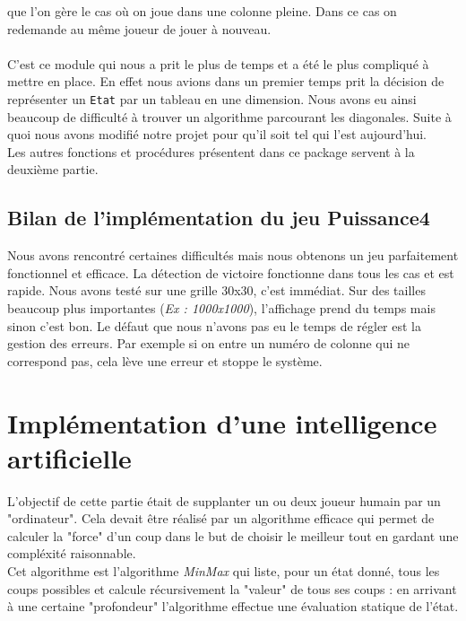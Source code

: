 \documentclass[a4paper,11pt]{article}
\begin{document}
que l'on gère le cas où on joue dans une colonne pleine. Dans ce cas on
redemande au même joueur de jouer à nouveau.\\
\\
C'est ce module qui nous a prit le plus de temps et a été le plus compliqué
à mettre en place. En effet nous avions dans un premier temps prit la décision
de représenter un {\tt Etat} par un tableau en une dimension. Nous avons eu
ainsi beaucoup de difficulté à trouver un algorithme parcourant les diagonales.
Suite à quoi nous avons modifié notre projet pour qu'il soit tel qui l'est
aujourd'hui. \\
Les autres fonctions et procédures présentent dans ce package servent à la
deuxième partie. \\

\subsection{Bilan de l'implémentation du jeu Puissance4}

Nous avons rencontré certaines difficultés mais nous obtenons un jeu parfaitement
fonctionnel et efficace. La détection de victoire fonctionne dans tous les cas et
est rapide. Nous avons testé sur une grille 30x30, c'est immédiat. Sur des tailles
beaucoup plus importantes ({\it Ex : 1000x1000}), l'affichage prend du temps mais
sinon c'est bon. Le défaut que nous n'avons pas eu le temps de régler est la
gestion des erreurs. Par exemple si on entre un numéro de colonne qui ne correspond
pas, cela lève une erreur et stoppe le système.


\section{Implémentation d'une intelligence artificielle}

L'objectif de cette partie était de supplanter un ou deux joueur humain par un
"ordinateur". Cela devait être réalisé par un algorithme efficace qui permet de
calculer la "force" d'un coup dans le but de choisir le meilleur tout en gardant
une compléxité raisonnable.\\
Cet algorithme est l'algorithme {\it MinMax} qui liste, pour un état donné, tous
les coups possibles et calcule récursivement la "valeur" de tous ses coups : en
arrivant à une certaine "profondeur" l'algorithme effectue une évaluation statique
de l'état.
\end{document}
